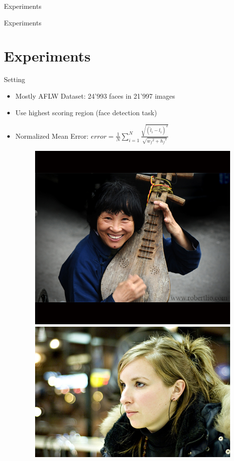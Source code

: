 \documentclass{beamer}
\begin{document}
\begin{frame}{Experiments}
\begin{center}
\begin{huge}
Experiments
\end{huge}
\end{center}
\end{frame}

\section{Experiments}
\begin{frame}{Setting}
\begin{itemize}
\item Mostly AFLW Dataset:  24'993 faces in 21'997 images
\item Use highest scoring region (face detection task)
\item Normalized Mean Error: $error = \frac{1}{N} \sum_{i = 1}^N \frac{\sqrt{(\hat{l}_i - l_i)^2}}{\sqrt{{w_f}^2 + {h_f}^2}}$
\begin{figure}
\centering
\includegraphics[scale=0.2]{fig/aflw_example2}
\includegraphics[scale=0.2]{fig/aflw_example3}
\end{figure}
\end{itemize}

\end{frame}
\end{document}
